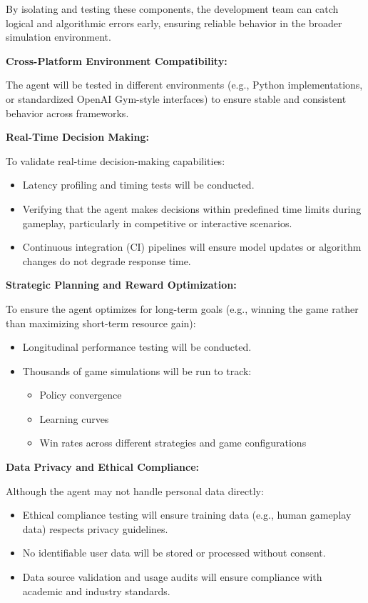 \documentclass{article}
\begin{document}
By isolating and testing these components, the development team can catch logical and algorithmic errors early, ensuring reliable behavior in the broader simulation environment. \newline

\noindent\textbf{Cross-Platform Environment Compatibility:}

The agent will be tested in different \emph{\Catan{}} environments (e.g., Python implementations, or standardized OpenAI Gym-style interfaces) to ensure stable and consistent behavior across frameworks. \newline

\noindent\textbf{Real-Time Decision Making:}

To validate real-time decision-making capabilities:
\begin{itemize}
    \item Latency profiling and timing tests will be conducted.
    \item Verifying that the agent makes decisions within predefined time limits during gameplay, particularly in competitive or interactive scenarios.
    \item Continuous integration (CI) pipelines will ensure model updates or algorithm changes do not degrade response time.
\end{itemize}

\noindent\textbf{Strategic Planning and Reward Optimization:}

To ensure the \RL{} agent optimizes for long-term goals (e.g., winning the game rather than maximizing short-term resource gain):
\begin{itemize}
    \item Longitudinal performance testing will be conducted.
    \item Thousands of game simulations will be run to track:
    \begin{itemize}
        \item Policy convergence
        \item Learning curves
        \item Win rates across different strategies and game configurations
    \end{itemize}
\end{itemize}

\noindent\textbf{Data Privacy and Ethical Compliance:}

Although the \RL{} agent may not handle personal data directly:
\begin{itemize}
    \item Ethical compliance testing will ensure training data (e.g., human gameplay data) respects privacy guidelines.
    \item No identifiable user data will be stored or processed without consent.
    \item Data source validation and usage audits will ensure compliance with academic and industry standards.
\end{itemize}
\end{document}
